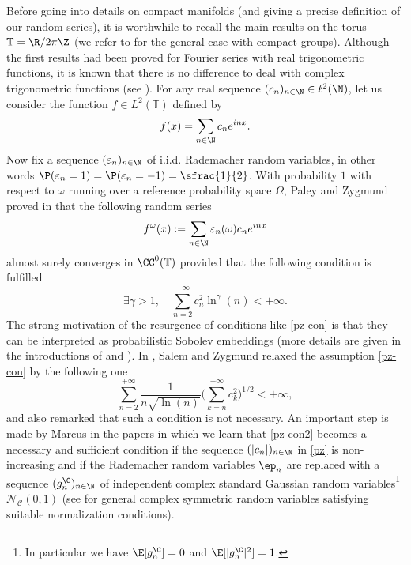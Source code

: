 Before going into details on compact manifolds (and giving a precise definition of our random series), it is worthwhile to recall the main results on the torus $\mathbb{T}=\R/ 2\pi \Z$ (we refer to \cite{pisier1981} for the general case with compact groups). Although the first results had been proved for Fourier series with real trigonometric functions, it is known that there is no difference to deal with complex trigonometric functions (see \cite[p.\,122]{pisier1981}). For any real sequence $(c_n)_{n\in \N}\in \ell^2(\N)$, let us consider the function $f\in L^2(\mathbb{T})$ defined by
\begin{equation*}
f(x)=\sum_{n\in \N}c_n e^{inx}.
\end{equation*}
Now fix a sequence $(\varepsilon_n)_{n\in \N}$ of i.i.d. Rademacher random variables, in other words $\P(\varepsilon_n=1)=\P(\varepsilon_n=-1)=\sfrac{1}{2}$.
With probability $1$ with respect to $\omega$ running over a reference probability space $\Omega$, Paley and Zygmund proved in \cite[p.\,347]{paley1930} that the following random series
\begin{equation}\label{pz}
f^\omega(x):=\sum_{n\in \N}\varepsilon_n(\omega) c_n e^{inx}
\end{equation}
almost surely converges in $\CC^0(\mathbb{T})$ provided that the following condition is fulfilled
\begin{equation}\label{pz-con}
\exists \gamma>1, \quad \sum_{n=2}^{+\infty} c_n^2 \ln^{\gamma}(n)<+\infty.
\end{equation}
The strong motivation of the resurgence of conditions like \eqref{pz-con} is that they can be interpreted as probabilistic Sobolev embeddings (more details are given in the introductions of \cite{Tzvetkov4,burq-lebeau} and \cite[p.\,2734]{imek-aif}).
In \cite[p.\,291]{salem1954}, Salem and Zygmund relaxed the assumption \eqref{pz-con} by the following one
\begin{equation}\label{pz-con2}
\sum_{n=2}^{+\infty} \frac{1}{n\sqrt{\ln(n)}}\biggl(\sum_{k=n}^{+\infty}c_k^2 \biggr)^{1/2} <+\infty,
\end{equation}
and also remarked that such a condition is not necessary.
An important step is made by Marcus in the papers \cite{marcus1973,marcus1975} in which we learn that \eqref{pz-con2} becomes a necessary and sufficient condition if the sequence $(|c_n|)_{n\in \N}$ in \eqref{pz} is non-increasing and if the Rademacher random variables $\ep_n$ are replaced with a sequence $(g_n^{\C})_{n\in \N}$ of independent complex standard Gaussian random variables\footnote{In particular we have $\E[g_n^\C]=0$ and $\E[|g_n^\C|^2]=1$.} $\mathcal{N}_\mathcal{C}(0,1)$ (see \cite{marcus1975} for general complex symmetric random variables satisfying suitable normalization conditions).


